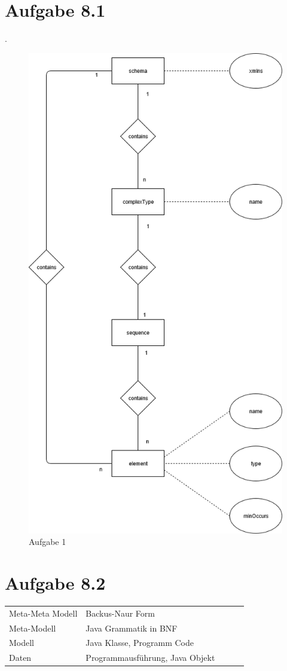 \documentclass{article}
\begin{document}
	
	
	
	
	\section*{Aufgabe 8.1}.
		\begin{center}
	
			\begin{figure}[h!]
				\includegraphics[width=0.4\linewidth]{exercise_8_1.png}
				\caption{Aufgabe 1}
				\label{fig:exercise_8_1.png}
			\end{figure}
		\end{center}
		
	\section*{Aufgabe 8.2}
	\begin{table}[h!]
		\begin{tabular}{|l|l|lll}
			\cline{1-2}
			Meta-Meta Modell & Backus-Naur Form                &  &  &  \\ \cline{1-2}
			Meta-Modell      & Java Grammatik in BNF           &  &  &  \\ \cline{1-2}
			Modell           & Java Klasse, Programm Code      &  &  &  \\ \cline{1-2}
			Daten            & Programmausführung, Java Objekt &  &  &  \\ \cline{1-2}
		\end{tabular}
	\end{table}
	
\end{document}
